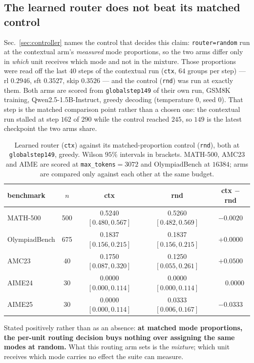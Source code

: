 \subsection{The learned router does not beat its matched control}
\label{sec:routernull}

Sec.~\ref{sec:controller} names the control that decides this claim: \texttt{router=random}
run at the contextual arm's \emph{measured} mode proportions, so the two arms differ only in
\emph{which} unit receives which mode and not in the mixture. Those proportions were read off
the last $40$ steps of the contextual run (\texttt{ctx}, $64$ groups per step) --- rl
$0.2946$, sft $0.3527$, skip $0.3526$ --- and the control (\texttt{rnd}) was run at exactly
them. Both arms are scored from \texttt{globalstep149} of their own run, GSM8K training,
Qwen2.5-1.5B-Instruct, greedy decoding (temperature $0$, seed $0$). That step is the matched
comparison point rather than a chosen one: the contextual run stalled at step $162$ of $290$
while the control reached $245$, so $149$ is the latest checkpoint the two arms share.

\begin{table}[t]
\centering\small
\caption{Learned router (\texttt{ctx}) against its matched-proportion control (\texttt{rnd}),
both at \texttt{globalstep149}, greedy. Wilson $95\%$ intervals in brackets. MATH-500, AMC23
and AIME are scored at \texttt{max\_tokens}${=}3072$ and OlympiadBench at $16384$; arms are
compared only against each other at the same budget.}
\label{tab:routernull}
\begin{tabular}{lcccc}
\toprule
benchmark & $n$ & ctx & rnd & ctx $-$ rnd \\
\midrule
MATH-500      & 500 & 0.5240 $[0.480, 0.567]$ & 0.5260 $[0.482, 0.569]$ & $-0.0020$ \\
OlympiadBench & 675 & 0.1837 $[0.156, 0.215]$ & 0.1837 $[0.156, 0.215]$ & $+0.0000$ \\
AMC23         & 40  & 0.1750 $[0.087, 0.320]$ & 0.1250 $[0.055, 0.261]$ & $+0.0500$ \\
AIME24        & 30  & 0.0000 $[0.000, 0.114]$ & 0.0000 $[0.000, 0.114]$ & $\phantom{+}0.0000$ \\
AIME25        & 30  & 0.0000 $[0.000, 0.114]$ & 0.0333 $[0.006, 0.167]$ & $-0.0333$ \\
\bottomrule
\end{tabular}
\end{table}

Stated positively rather than as an absence: \textbf{at matched mode proportions, the
per-unit routing decision buys nothing over assigning the same modes at random.} What this
routing arm sets is the \emph{mixture}; which unit receives which mode carries no effect the
suite can measure.

